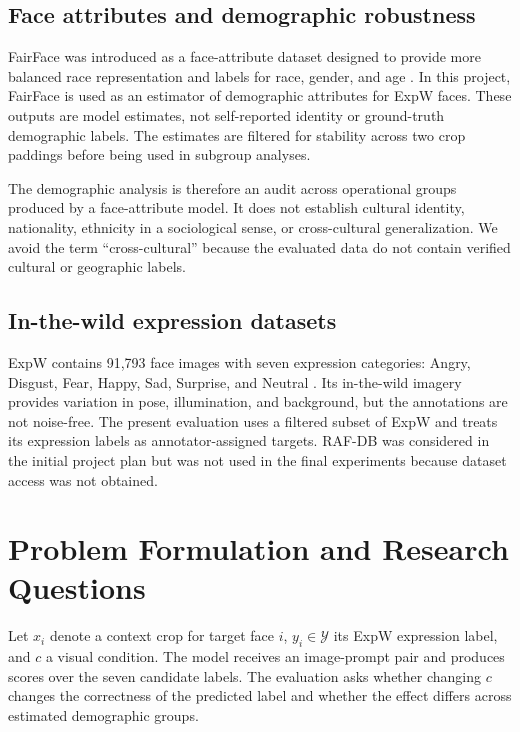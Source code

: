 \documentclass[lettersize,journal]{IEEEtran}
\begin{document}
\subsection{Face attributes and demographic robustness}
FairFace was introduced as a face-attribute dataset designed to provide more balanced race representation and labels for race, gender, and age \cite{karkkainen2021fairface}. In this project, FairFace is used as an estimator of demographic attributes for ExpW faces. These outputs are model estimates, not self-reported identity or ground-truth demographic labels. The estimates are filtered for stability across two crop paddings before being used in subgroup analyses.

The demographic analysis is therefore an audit across operational groups produced by a face-attribute model. It does not establish cultural identity, nationality, ethnicity in a sociological sense, or cross-cultural generalization. We avoid the term ``cross-cultural'' because the evaluated data do not contain verified cultural or geographic labels.

\subsection{In-the-wild expression datasets}
ExpW contains 91,793 face images with seven expression categories: Angry, Disgust, Fear, Happy, Sad, Surprise, and Neutral \cite{peng2016expw}. Its in-the-wild imagery provides variation in pose, illumination, and background, but the annotations are not noise-free. The present evaluation uses a filtered subset of ExpW and treats its expression labels as annotator-assigned targets. RAF-DB was considered in the initial project plan but was not used in the final experiments because dataset access was not obtained.

\section{Problem Formulation and Research Questions}
Let $x_i$ denote a context crop for target face $i$, $y_i \in \mathcal{Y}$ its ExpW expression label, and $c$ a visual condition. The model receives an image-prompt pair and produces scores over the seven candidate labels. The evaluation asks whether changing $c$ changes the correctness of the predicted label and whether the effect differs across estimated demographic groups.
\end{document}
